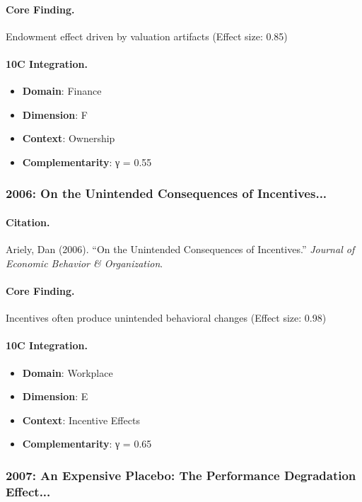 \paragraph{Core Finding.}
Endowment effect driven by valuation artifacts (Effect size: 0.85)

\paragraph{10C Integration.}
\begin{itemize}[nosep]
  \item \textbf{Domain}: Finance
  \item \textbf{Dimension}: F
  \item \textbf{Context}: Ownership
  \item \textbf{Complementarity}: γ = 0.55
\end{itemize}

\subsubsection{2006: On the Unintended Consequences of Incentives...}

\paragraph{Citation.}
Ariely, Dan (2006). ``On the Unintended Consequences of Incentives.''
\textit{Journal of Economic Behavior & Organization}.

\paragraph{Core Finding.}
Incentives often produce unintended behavioral changes (Effect size: 0.98)

\paragraph{10C Integration.}
\begin{itemize}[nosep]
  \item \textbf{Domain}: Workplace
  \item \textbf{Dimension}: E
  \item \textbf{Context}: Incentive Effects
  \item \textbf{Complementarity}: γ = 0.65
\end{itemize}

\subsubsection{2007: An Expensive Placebo: The Performance Degradation Effect...}

